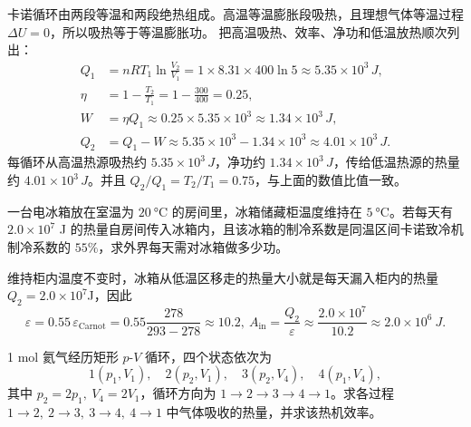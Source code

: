 \begin{solution}
卡诺循环由两段等温和两段绝热组成。高温等温膨胀段吸热，且理想气体等温过程 \(\Delta U=0\)，所以吸热等于等温膨胀功。
把高温吸热、效率、净功和低温放热顺次列出：
\[
\begin{aligned}
Q_1&=nRT_1\ln\frac{V_2}{V_1}
=1\times8.31\times400\ln5
\approx 5.35\times10^3\,\si{J},\\
\eta&=1-\frac{T_2}{T_1}
=1-\frac{300}{400}
=0.25,\\
W&=\eta Q_1
\approx0.25\times5.35\times10^3
\approx1.34\times10^3\,\si{J},\\
Q_2&=Q_1-W
\approx 5.35\times10^3-1.34\times10^3
\approx4.01\times10^3\,\si{J}.
\end{aligned}
\]
每循环从高温热源吸热约 \(5.35\times10^3\,\si{J}\)，净功约 \(1.34\times10^3\,\si{J}\)，传给低温热源的热量约 \(4.01\times10^3\,\si{J}\)。并且 \(Q_2/Q_1=T_2/T_1=0.75\)，与上面的数值比值一致。
\end{solution}


\begin{exercise}[电冰箱的输入功怎样由致冷系数反推]
一台电冰箱放在室温为 \(\SI{20}{\celsius}\) 的房间里，冰箱储藏柜温度维持在 \(\SI{5}{\celsius}\)。若每天有 \(2.0\times10^7\) J 的热量自房间传入冰箱内，且该冰箱的制冷系数是同温区间卡诺致冷机制冷系数的 \(55\%\)，求外界每天需对冰箱做多少功。
\end{exercise}

\begin{solution}
维持柜内温度不变时，冰箱从低温区移走的热量大小就是每天漏入柜内的热量$Q_2=2.0\times10^7$J，因此
 \[\varepsilon=0.55\,\varepsilon_{\text{Carnot}}=0.55\frac{278}{293-278}\approx 10.2,~A_{\text{in}}=\frac{Q_2}{\varepsilon} \approx \frac{2.0\times10^7}{10.2} \approx 2.0\times10^6\ \si{J}.\]
\end{solution}

\begin{exercise}
1 mol 氦气经历矩形 \(p\)-\(V\) 循环，四个状态依次为
\[
1(p_1,V_1),\quad 2(p_2,V_1),\quad 3(p_2,V_4),\quad 4(p_1,V_4),
\]
其中 \(p_2=2p_1,\ V_4=2V_1\)，循环方向为 \(1\to2\to3\to4\to1\)。求各过程 \(1\to2,\ 2\to3,\ 3\to4,\ 4\to1\) 中气体吸收的热量，并求该热机效率。
\end{exercise}

